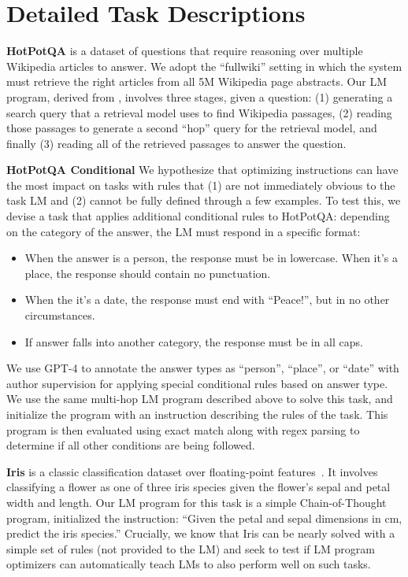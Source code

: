 \clearpage
\section{Detailed Task Descriptions}
\label{sec:test_train_split}
\label{sec:task_desc}

\textbf{HotPotQA} \cite{yang-etal-2018-hotpotqa} is a dataset of  questions that require reasoning over multiple Wikipedia articles to answer. We adopt the ``fullwiki'' setting in which the system must retrieve the right articles from all 5M Wikipedia page abstracts. Our LM program, derived from \citealt{khattab2024dspy}, involves three stages, given a question: (1) generating a search query that a retrieval model uses to find Wikipedia passages, (2) reading those passages to generate a second ``hop'' query for the retrieval model, and finally (3) reading all of the retrieved passages to answer the question. %

\textbf{HotPotQA Conditional} We hypothesize that optimizing instructions can have the most impact on tasks with rules that (1) are not immediately obvious to the task LM and (2) cannot be fully defined through a few examples. To test this, we devise a task that applies additional conditional rules to HotPotQA: depending on the category of the answer, the LM must respond in a specific format:
\begin{itemize}\setlength{\itemsep}{0pt}
\item When the answer is a person, the response must be in lowercase. When it's a place, the response should contain no punctuation. 
\item When the it's a date, the response must end with ``Peace!'', but in no other circumstances. 
\item If answer falls into another category, the response must be in all caps.
\end{itemize}
We use GPT-4 to annotate the answer types as ``person'', ``place'', or ``date'' with author supervision for applying special conditional rules based on answer type. We use the same multi-hop LM program described above to solve this task, and initialize the program with an instruction describing the rules of the task. This program is then evaluated using exact match along with regex parsing to determine if all other conditions are being followed.

\textbf{Iris} is a classic classification dataset over floating-point features~\citep{Fisher1936THEUO}. It involves classifying a flower as one of three iris species given the flower's sepal and petal width and length.  Our LM program for this task is a simple Chain-of-Thought program, initialized the instruction: ``Given the petal and sepal dimensions in cm, predict the iris species.'' Crucially, we know that Iris can be nearly solved with a simple set of rules (not provided to the LM) and seek to test if LM program optimizers can automatically teach LMs to also perform well on such tasks.

